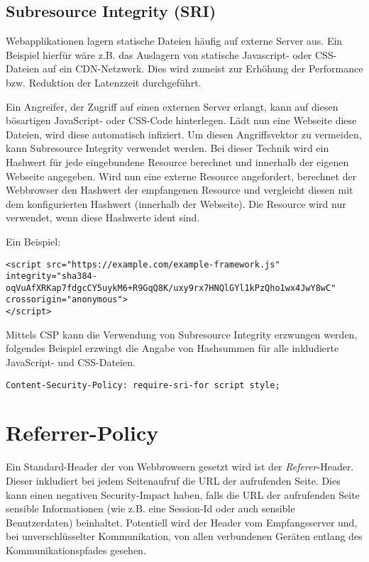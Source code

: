 \subsection{Subresource Integrity (SRI)}

Webapplikationen lagern statische Dateien häufig auf externe Server aus. Ein Beispiel hierfür wäre z.B. das Auslagern von statische Javascript- oder CSS-Dateien auf ein CDN-Netzwerk. Dies wird zumeist zur Erhöhung der Performance bzw. Reduktion der Latenzzeit durchgeführt.

Ein Angreifer, der Zugriff auf einen externen Server erlangt, kann auf diesen bösartigen JavaScript- oder CSS-Code hinterlegen. Lädt nun eine Webseite diese Dateien, wird diese automatisch infiziert. Um diesen Angriffsvektor zu vermeiden, kann Subresource Integrity verwendet werden. Bei dieser Technik wird ein Hashwert für jede eingebundene Resource berechnet und innerhalb der eigenen Webseite angegeben. Wird nun eine externe Resource angefordert, berechnet der Webbrowser den Hashwert der empfangenen Resource und vergleicht diesen mit dem konfigurierten Hashwert (innerhalb der Webseite). Die Resource wird nur verwendet, wenn diese Hashwerte ident sind.

Ein Beispiel:

\begin{verbatim}
<script src="https://example.com/example-framework.js"
integrity="sha384-oqVuAfXRKap7fdgcCY5uykM6+R9GqQ8K/uxy9rx7HNQlGYl1kPzQho1wx4JwY8wC"
crossorigin="anonymous">
</script>
\end{verbatim}

Mittels CSP kann die Verwendung von Subresource Integrity erzwungen werden, folgendes Beispiel erzwingt die Angabe von Hashsummen für alle inkludierte JavaScript- und CSS-Dateien.

\begin{verbatim}
Content-Security-Policy: require-sri-for script style;
\end{verbatim}


\section{Referrer-Policy}
\label{referrer_policy}

Ein Standard-Header der von Webbrowsern gesetzt wird ist der \textit{Referer}-Header. Dieser inkludiert bei jedem Seitenaufruf die URL der aufrufenden Seite. Dies kann einen negativen Security-Impact haben, falls die URL der aufrufenden Seite sensible Informationen (wie z.B. eine Session-Id oder auch sensible Benutzerdaten) beinhaltet. Potentiell wird der Header vom Empfangsserver und, bei unverschlüsselter Kommunikation, von allen verbundenen Geräten entlang des Kommunikationspfades gesehen.

